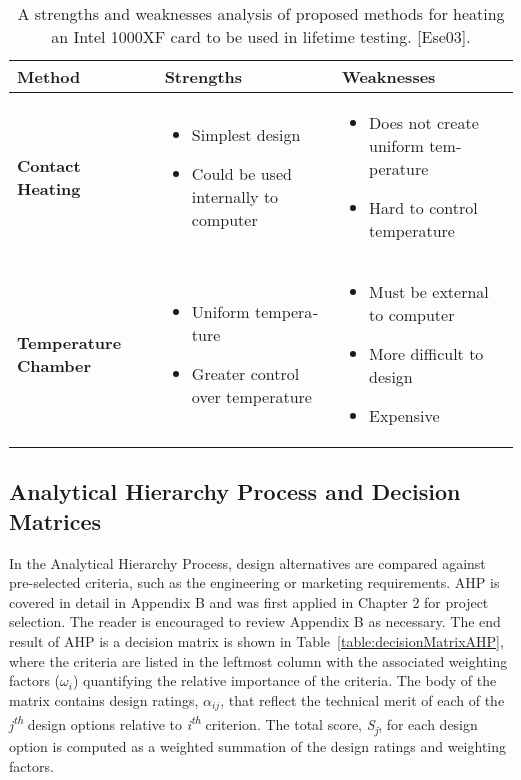 \begin{table}

\caption{A strengths and weaknesses analysis of proposed
methods for heating an Intel 1000XF card to be used in lifetime testing.
{[}Ese03{]}.}
\label{table:strengthWeakIntel}
\begin{tabular}{|m{3cm}|m{5cm}|m{5cm}|}
\hline
\textbf{Method} &
\textbf{Strengths} &
\textbf{Weaknesses} \\ \hline

\textbf{Contact Heating} & 
\begin{itemize}
\item   Simplest design
\item   Could be used internally to computer
\end{itemize}   &

\begin{itemize}
\item   Does not create uniform tem­perature
\item   Hard to control tempera­ture
\end{itemize} \\ \hline

\textbf{Temperature Chamber} &
\begin{itemize}
\item  Uniform tempera­ture
\item  Greater control over tem­perature
\end{itemize}
&
\begin{itemize}
\item   Must be external to computer
\item   More difficult to design
\item   Expensive
\end{itemize}\\ \hline

\end{tabular}
\end{table}

\subsection{Analytical Hierarchy Process and Decision Matrices}
\label{subsection:analytical-hierarchy-process-and-decision-matrices}

In the Analytical Hierarchy Process, design alternatives are compared
against pre-selected criteria, such as the engineering or marketing
requirements. AHP is covered in detail in Appendix B and was first
applied in Chapter 2 for project selection. The reader is encouraged to
review Appendix B as necessary. The end result of AHP is a decision
matrix is shown in 
Table~\ref{table:decisionMatrixAHP}, where the criteria are listed in the
leftmost column with the associated weighting factors
($\omega_i$) quantifying the relative
importance of the criteria. The body of the matrix contains design
ratings, $\alpha_{ij}$, that reflect the
technical merit of each of the \emph{j\textsuperscript{th}} design
options relative to \emph{i\textsuperscript{th}} criterion. The total
score, \emph{S\textsubscript{j}}, for each design option is computed as
a weighted summation of the design ratings and weighting factors.

